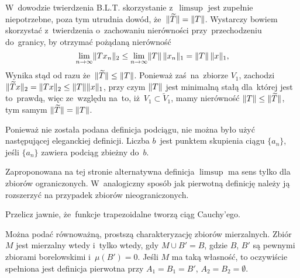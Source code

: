 \documentclass[a4paper,11pt]{article}
\begin{document}
\vspace{\spaceFour}



\start {} W~dowodzie twierdzenia B.L.T. skorzystanie z~$\limsup$
jest zupełnie niepotrzebne, poza tym utrudnia dowód,
że~$\Vert \widetilde{ T } \Vert = \lVert{  T  }\rVert$. Wystarczy bowiem skorzystać
z~twierdzenia o~zachowaniu nierówności przy~przechodzeniu do~granicy,
by otrzymać pożądaną nierówność
\begin{equation}
  \label{eq:RS-Vol-I-s01-13}
  \lim\limits_{ n \to \infty } \lVert{  T x_{ n }  }\rVert_{ 2 }
  \leq \lim\limits_{ n \to \infty } \lVert{  T  }\rVert \, \lVert{  x_{ n }  }\rVert_{ 1 }
  = \lVert{  T  }\rVert \, \lVert{  x  }\rVert_{ 1 },
\end{equation}
Wynika stąd od razu że~$\Vert \widetilde{ T } \Vert \leq \lVert{  T  }\rVert$. Ponieważ
zaś~na~zbiorze $V_{ 1 }$, zachodzi
$\Vert \widetilde{ T } x \Vert_{ 2 } = \lVert{  T x  }\rVert_{ 2 } \leq \lVert{  T  }\rVert \lVert{  x
 }\rVert_{ 1 }$, przy czym $\lVert{  T  }\rVert$ jest minimalną stałą dla~której jest
to~prawdą, więc ze~względu na~to, iż~$V_{ 1 } \subset \widetilde{ V }_{ 1 }$,
mamy nierówność $\lVert{  T  }\rVert \leq \Vert \widetilde{ T } \Vert$, tym samym
$\Vert \widetilde{ T } \Vert = \lVert{  T  }\rVert$. %

\vspace{\spaceFour}



\start {} Ponieważ nie została podana definicja podciągu, nie
można było użyć następującej eleganckiej definicji. Liczba $b$~jest
punktem skupienia ciągu $\{ a_{ n } \}$, jeśli $\{ a_{ n } \}$ zawiera
podciąg zbieżny do~$b$. %

\vspace{\spaceFour}



\start {} Zaproponowana na tej stronie alternatywna definicja
$\limsup$ ma sens tylko dla zbiorów ograniczonych. W~analogiczny
sposób jak pierwotną definicję należy ją rozszerzyć na przypadek
zbiorów nieograniczonych. %

\vspace{\spaceFour}



\start {} Przelicz jawnie, że~funkcje trapezoidalne tworzą ciąg
Cauchy'ego. \Dok

\vspace{\spaceFour}



\start {} Można podać równoważną, prostszą charakteryzację
zbiorów mierzalnych. Zbiór $M$ jest mierzalny wtedy i~tylko wtedy, gdy
$M \cup B' = B$, gdzie $B$, $B'$ są pewnymi zbiorami borelowskimi
i~$\mu( B' ) = 0$. Jeśli $M$ ma taką własność, to oczywiście spełniona
jest definicja pierwotna przy $A_{ 1 } = B_{ 1 } = B'$,
$A_{ 2 } = B_{ 2 } = \emptyset$.
\end{document}
